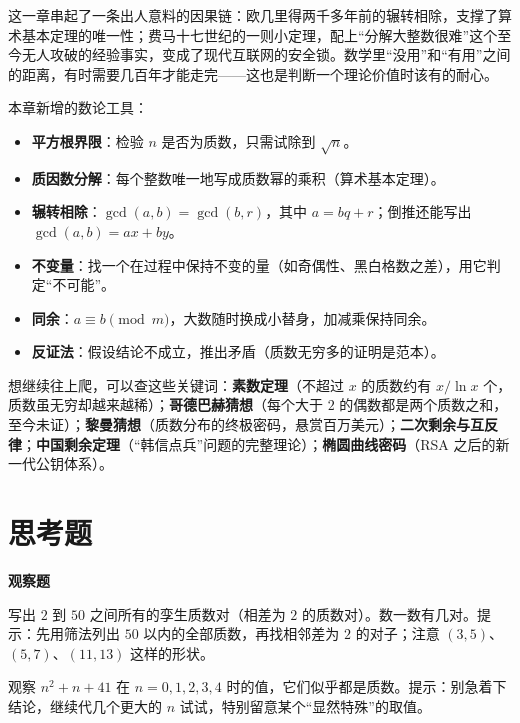 \begin{lianjie}
这一章串起了一条出人意料的因果链：欧几里得两千多年前的辗转相除，支撑了算术基本定理的唯一性；费马十七世纪的一则小定理，配上“分解大整数很难”这个至今无人攻破的经验事实，变成了现代互联网的安全锁。数学里“没用”和“有用”之间的距离，有时需要几百年才能走完——这也是判断一个理论价值时该有的耐心。
\end{lianjie}

\begin{toolbox}
本章新增的数论工具：
\begin{itemize}
  \item \textbf{平方根界限}：检验 $n$ 是否为质数，只需试除到 $\sqrt{n}$。
  \item \textbf{质因数分解}：每个整数唯一地写成质数幂的乘积（算术基本定理）。
  \item \textbf{辗转相除}：$\gcd(a,b)=\gcd(b,r)$，其中 $a=bq+r$；倒推还能写出 $\gcd(a,b)=ax+by$。
  \item \textbf{不变量}：找一个在过程中保持不变的量（如奇偶性、黑白格数之差），用它判定“不可能”。
  \item \textbf{同余}：$a\equiv b\pmod{m}$，大数随时换成小替身，加减乘保持同余。
  \item \textbf{反证法}：假设结论不成立，推出矛盾（质数无穷多的证明是范本）。
\end{itemize}
\end{toolbox}

\begin{pandeng}
想继续往上爬，可以查这些关键词：\textbf{素数定理}（不超过 $x$ 的质数约有 $x/\ln x$ 个，质数虽无穷却越来越稀）；\textbf{哥德巴赫猜想}（每个大于 $2$ 的偶数都是两个质数之和，至今未证）；\textbf{黎曼猜想}（质数分布的终极密码，悬赏百万美元）；\textbf{二次剩余与互反律}；\textbf{中国剩余定理}（“韩信点兵”问题的完整理论）；\textbf{椭圆曲线密码}（RSA 之后的新一代公钥体系）。
\end{pandeng}

\section*{思考题}

\textbf{观察题}
\begin{sikao}
  \item 写出 $2$ 到 $50$ 之间所有的孪生质数对（相差为 $2$ 的质数对）。数一数有几对。提示：先用筛法列出 $50$ 以内的全部质数，再找相邻差为 $2$ 的对子；注意 $(3,5)$、$(5,7)$、$(11,13)$ 这样的形状。
  \item 观察 $n^2+n+41$ 在 $n=0,1,2,3,4$ 时的值，它们似乎都是质数。提示：别急着下结论，继续代几个更大的 $n$ 试试，特别留意某个“显然特殊”的取值。
\end{sikao}

